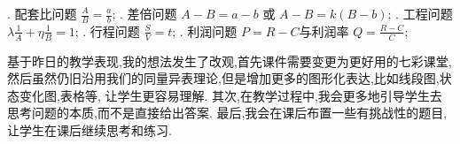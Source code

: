 \documentclass[lang=cn,12pt,fontset=none,a4paper]{beautybook}
\begin{document}
\begin{proposition}
\begin{myitemize}
. 配套比问题 $\frac{A}{B}=\frac{a}{b}$;
. 差倍问题 $A-B=a-b$ 或 $A-B=k(B-b)$;
. 工程问题 $\lambda\frac{1}{A}+\eta\frac{1}{B}=1$;
. 行程问题 $\frac{S}{V}=t$;
. 利润问题 $P=R-C$与利润率 $Q=\frac{R-C}{C}$;

\end{myitemize}

\end{proposition}

基于昨日的教学表现,我的想法发生了改观,首先课件需要变更为更好用的七彩课堂, 然后虽然仍旧沿用我们的同量异表理论,但是增加更多的图形化表达,比如线段图,状态变化图,表格等, 让学生更容易理解. 其次,在教学过程中,我会更多地引导学生去思考问题的本质,而不是直接给出答案. 最后,我会在课后布置一些有挑战性的题目,让学生在课后继续思考和练习.




\clearpage
\printbibliography[heading=bibintoc,title={Bibliography}]\printindex\thispagestyle{empty}
\ISBNcode{\EANisbn[ISBN=978-80-7340-097-2]} %
\makebottomcover
\end{document}
